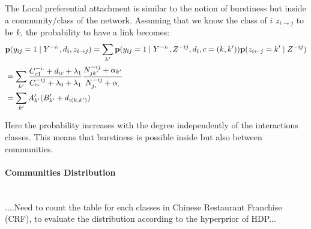 The Local preferential attachment is similar to the notion of burstiness but inside a community/class of the network. Assuming that we know the class of $i$ $z_{i\rightarrow j}$ to be $k$, the probability to have a link becomes: 
\begin{align}
&\mathbf{p}(y_{ij}=1 \mid Y^{-i\bm{.}}, d_i,z_{i\rightarrow j})  = \sum_{k'} \mathbf{p}(y_{ij}=1 \mid Y^{-i\bm{.}}, Z^{-ij}, d_i , c=(k,k')) \mathbf{p}(z_{i\leftarrow j}=k' \mid Z^{-ij} ) \\
&= \sum_{k'} \frac{C_{c1}^{-i.} + d_{ic} + \lambda_1}{C_{c\bm{.}}^{-ij} + \lambda_0 + \lambda_1} \frac{N_{jk'}^{-ij} + \alpha_{k'}}{ N_{j\bm{.}}^{-ij} + \alpha_{\bm{.}} } \\
&= \sum_{k'} A'_{k'} (B'_{k'} + d_{i(k,k')})
\end{align}

Here the probability increases with the degree independently of the interactions classes. This means that burstiness is possible inside but also between communities.

\paragraph{Communities Distribution}~\\

....Need to count the table for each classes in Chinese Restaurant Franchise (CRF), to evaluate the distribution according to the hyperprior of HDP...



